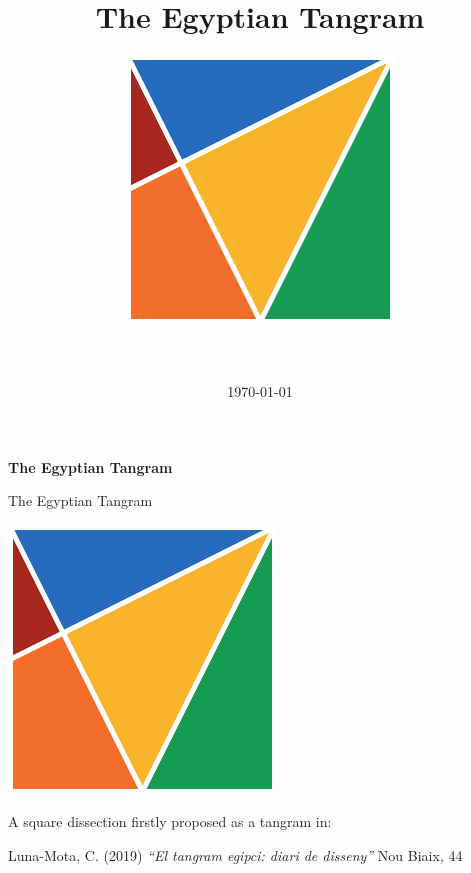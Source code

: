\documentclass[14pt]{beamer}
\title{The Egyptian Tangram\vspace{-0.25em}}
\author{
    \includegraphics[height=18ex]{figures/figure001a.pdf}\\
    \;\;{\small \textcopyright\ \href{https://github.com/CarlosLunaMota}{Carlos Luna-Mota}}\\
    \vspace{0.55em}
    \href{https://mmaca.cat/}{\large \framebox{\textbf{mmaca}}}\\
    \vspace{-1.85em}}
\date{\today}
\begin{document}

    \begin{frame}
      \titlepage
    \end{frame}


    \begin{frame}{}
        \begin{center}
            \textbf{\huge The Egyptian Tangram}
        \end{center}
    \end{frame}


    \begin{frame}{The Egyptian Tangram}
        \begin{center}
            \includegraphics[height=20ex]{figures/figure001a.pdf} \\

            \bigskip

            A square dissection firstly proposed as a tangram in:

            \bigskip

            {\footnotesize Luna-Mota, C. (2019) \emph{``El tangram egipci: diari de disseny''} Nou Biaix, 44}
        \end{center}
    \end{frame}

\end{document}
